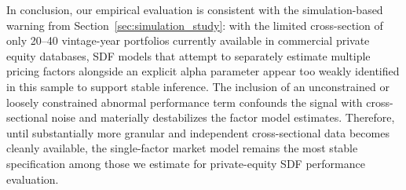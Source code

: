 In conclusion, our empirical evaluation is consistent with the simulation-based warning from Section~\ref{sec:simulation_study}: with the limited cross-section of only 20--40 vintage-year portfolios currently available in commercial private equity databases, SDF models that attempt to separately estimate multiple pricing factors alongside an explicit alpha parameter appear too weakly identified in this sample to support stable inference. 
The inclusion of an unconstrained or loosely constrained abnormal performance term confounds the signal with cross-sectional noise and materially destabilizes the factor model estimates.
Therefore, until substantially more granular and independent cross-sectional data becomes cleanly available, the single-factor market model remains the most stable specification among those we estimate for private-equity SDF performance evaluation.



